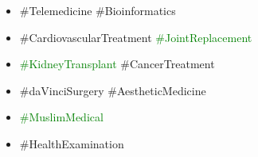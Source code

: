 \documentclass[25pt,a1paper]{tikzposter}
\begin{document}
{\begin{itemize}
As a renowned university hospital with a worldwide patients, TMWH is fully committed to offering the best service available.


\item \#Telemedicine \#Bioinformatics
\item \#CardiovascularTreatment \textcolor{green}{\#JointReplacement}
\item \textcolor{green}{\#KidneyTransplant} %
\#CancerTreatment
\item \#daVinciSurgery \#AestheticMedicine
\item \textcolor{green}{\#MuslimMedical}
\item \#HealthExamination
\end{itemize}
}

\end{document}
